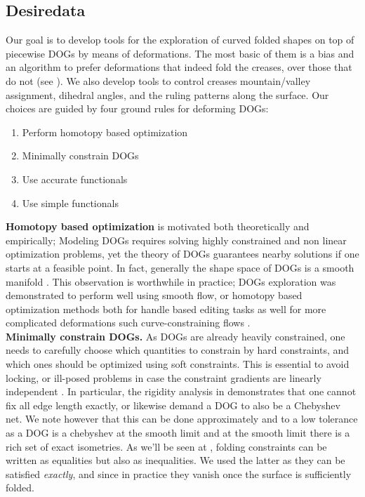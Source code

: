\subsection{Desiredata}
Our goal is to develop tools for the exploration of curved folded shapes on top of piecewise DOGs by means of deformations. The most basic of them is a bias and an algorithm to prefer deformations that indeed fold the creases, over those that do not (see ). We also develop tools to control creases mountain/valley assignment, dihedral angles, and the ruling patterns along the surface. Our choices are guided by four ground rules for deforming DOGs:
\begin{enumerate}
  \item Perform homotopy based optimization \label{homotopy_opt}
  \item Minimally constrain DOGs \label{minimal_const}
  \item Use accurate functionals \label{accurate_func}
  \item Use simple functionals
\end{enumerate}
\textbf{Homotopy based optimization} is motivated both theoretically and empirically; Modeling DOGs requires solving highly constrained and non linear optimization problems, yet the theory of DOGs guarantees nearby solutions if one starts at a feasible point. In fact, generally the shape space of DOGs is a smooth manifold \cite{rabi2018shape}. This observation is worthwhile in practice; DOGs exploration was demonstrated to perform well using smooth flow, or homotopy based optimization methods both for handle based editing tasks as well for more complicated deformations such curve-constraining flows \cite{rabi2018shape}. \\
\textbf{Minimally constrain DOGs.} As DOGs are already heavily constrained, one needs to carefully choose which quantities to constrain by hard constraints, and which ones should be optimized using soft constraints. This is essential to avoid locking, or ill-posed problems in case the constraint gradients are linearly independent \cite{rabi2018shape}. In particular, the rigidity analysis in \cite{rabi18} demonstrates that one cannot fix all edge length exactly, or likewise demand a DOG to also be a Chebyshev net. We note however that this can be done approximately and to a low tolerance as a DOG is a chebyshev at the smooth limit and at the smooth limit there is a rich set of exact isometries. As we'll be seen at , folding constraints can be written as equalities but also as inequalities. We used the latter as they can be satisfied \textit{exactly}, and since in practice they vanish once the surface is sufficiently folded. \\
